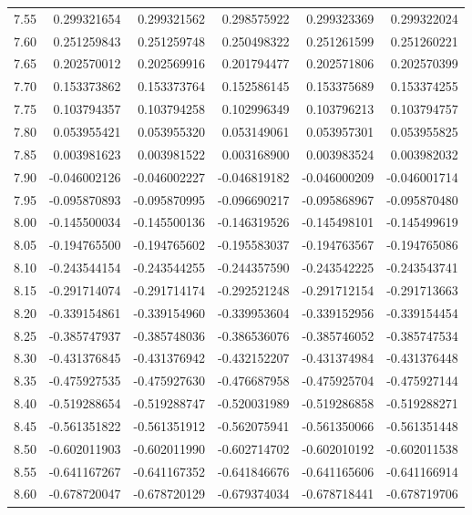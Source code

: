 \documentclass[11pt,a4paper]{article}
\begin{document}
\begin{longtable}{rrrrrr}
7.55 & 0.299321654 & 0.299321562 & 0.298575922 & 0.299323369 & 0.299322024 \\
7.60 & 0.251259843 & 0.251259748 & 0.250498322 & 0.251261599 & 0.251260221 \\
7.65 & 0.202570012 & 0.202569916 & 0.201794477 & 0.202571806 & 0.202570399 \\
7.70 & 0.153373862 & 0.153373764 & 0.152586145 & 0.153375689 & 0.153374255 \\
7.75 & 0.103794357 & 0.103794258 & 0.102996349 & 0.103796213 & 0.103794757 \\
7.80 & 0.053955421 & 0.053955320 & 0.053149061 & 0.053957301 & 0.053955825 \\
7.85 & 0.003981623 & 0.003981522 & 0.003168900 & 0.003983524 & 0.003982032 \\
7.90 & -0.046002126 & -0.046002227 & -0.046819182 & -0.046000209 & -0.046001714 \\
7.95 & -0.095870893 & -0.095870995 & -0.096690217 & -0.095868967 & -0.095870480 \\
8.00 & -0.145500034 & -0.145500136 & -0.146319526 & -0.145498101 & -0.145499619 \\
8.05 & -0.194765500 & -0.194765602 & -0.195583037 & -0.194763567 & -0.194765086 \\
8.10 & -0.243544154 & -0.243544255 & -0.244357590 & -0.243542225 & -0.243543741 \\
8.15 & -0.291714074 & -0.291714174 & -0.292521248 & -0.291712154 & -0.291713663 \\
8.20 & -0.339154861 & -0.339154960 & -0.339953604 & -0.339152956 & -0.339154454 \\
8.25 & -0.385747937 & -0.385748036 & -0.386536076 & -0.385746052 & -0.385747534 \\
8.30 & -0.431376845 & -0.431376942 & -0.432152207 & -0.431374984 & -0.431376448 \\
8.35 & -0.475927535 & -0.475927630 & -0.476687958 & -0.475925704 & -0.475927144 \\
8.40 & -0.519288654 & -0.519288747 & -0.520031989 & -0.519286858 & -0.519288271 \\
8.45 & -0.561351822 & -0.561351912 & -0.562075941 & -0.561350066 & -0.561351448 \\
8.50 & -0.602011903 & -0.602011990 & -0.602714702 & -0.602010192 & -0.602011538 \\
8.55 & -0.641167267 & -0.641167352 & -0.641846676 & -0.641165606 & -0.641166914 \\
8.60 & -0.678720047 & -0.678720129 & -0.679374034 & -0.678718441 & -0.678719706 \\

\end{longtable}
\end{document}
